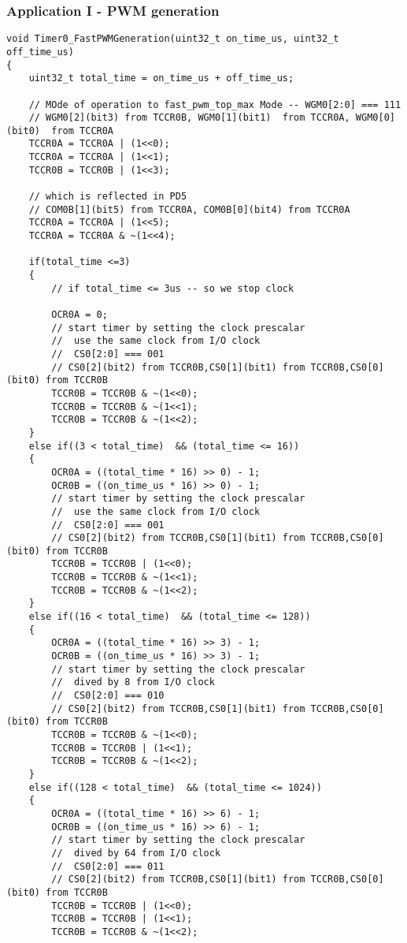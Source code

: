 \subsubsection{Application I - PWM generation}
\begin{verbatim}
void Timer0_FastPWMGeneration(uint32_t on_time_us, uint32_t off_time_us)
{
	uint32_t total_time = on_time_us + off_time_us;
		
	// MOde of operation to fast_pwm_top_max Mode -- WGM0[2:0] === 111
	// WGM0[2](bit3) from TCCR0B, WGM0[1](bit1)  from TCCR0A, WGM0[0](bit0)  from TCCR0A
	TCCR0A = TCCR0A | (1<<0);
	TCCR0A = TCCR0A | (1<<1);
	TCCR0B = TCCR0B | (1<<3);	

	// which is reflected in PD5
	// COM0B[1](bit5) from TCCR0A, COM0B[0](bit4) from TCCR0A
	TCCR0A = TCCR0A | (1<<5);
	TCCR0A = TCCR0A & ~(1<<4);
	
	if(total_time <=3)
	{
		// if total_time <= 3us -- so we stop clock
		
		OCR0A = 0;
		// start timer by setting the clock prescalar
		//  use the same clock from I/O clock
		//  CS0[2:0] === 001
		// CS0[2](bit2) from TCCR0B,CS0[1](bit1) from TCCR0B,CS0[0](bit0) from TCCR0B
		TCCR0B = TCCR0B & ~(1<<0);
		TCCR0B = TCCR0B & ~(1<<1);
		TCCR0B = TCCR0B & ~(1<<2);
	}
	else if((3 < total_time)  && (total_time <= 16))
	{
		OCR0A = ((total_time * 16) >> 0) - 1;
		OCR0B = ((on_time_us * 16) >> 0) - 1;
		// start timer by setting the clock prescalar
		//  use the same clock from I/O clock
		//  CS0[2:0] === 001
		// CS0[2](bit2) from TCCR0B,CS0[1](bit1) from TCCR0B,CS0[0](bit0) from TCCR0B
		TCCR0B = TCCR0B | (1<<0);
		TCCR0B = TCCR0B & ~(1<<1);
		TCCR0B = TCCR0B & ~(1<<2);
	}
	else if((16 < total_time)  && (total_time <= 128))
	{
		OCR0A = ((total_time * 16) >> 3) - 1;
		OCR0B = ((on_time_us * 16) >> 3) - 1;
		// start timer by setting the clock prescalar
		//  dived by 8 from I/O clock
		//  CS0[2:0] === 010
		// CS0[2](bit2) from TCCR0B,CS0[1](bit1) from TCCR0B,CS0[0](bit0) from TCCR0B
		TCCR0B = TCCR0B & ~(1<<0);
		TCCR0B = TCCR0B | (1<<1);
		TCCR0B = TCCR0B & ~(1<<2);
	}
	else if((128 < total_time)  && (total_time <= 1024))
	{
		OCR0A = ((total_time * 16) >> 6) - 1;
		OCR0B = ((on_time_us * 16) >> 6) - 1;
		// start timer by setting the clock prescalar
		//  dived by 64 from I/O clock
		//  CS0[2:0] === 011
		// CS0[2](bit2) from TCCR0B,CS0[1](bit1) from TCCR0B,CS0[0](bit0) from TCCR0B
		TCCR0B = TCCR0B | (1<<0);
		TCCR0B = TCCR0B | (1<<1);
		TCCR0B = TCCR0B & ~(1<<2);
		

\end{verbatim}
